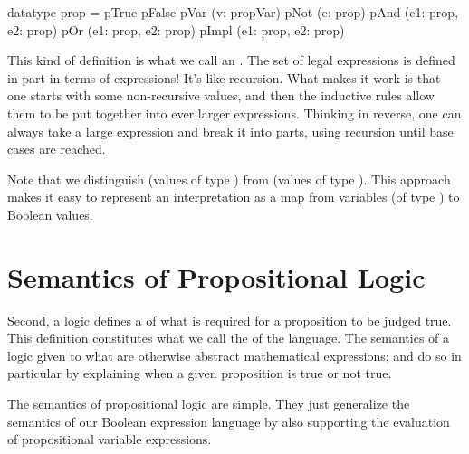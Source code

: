\documentclass[letterpaper,10pt,english]{sphinxmanual}
\begin{document}
\begin{sphinxVerbatim}[commandchars=\\\{\}]
datatype prop =
   pTrue \textbar{}
   pFalse \textbar{}
   pVar (v: propVar) \textbar{}
   pNot (e: prop) \textbar{}
   pAnd (e1: prop, e2: prop) \textbar{}
   pOr (e1: prop, e2: prop) \textbar{}
   pImpl (e1: prop, e2: prop)
\end{sphinxVerbatim}

This kind of definition is what we call an . The
set of legal expressions is defined in part in terms of expressions!
It’s like recursion. What makes it work is that one starts with some
non-recursive  values, and then the inductive rules allow them
to be put together into ever larger expressions. Thinking in reverse,
one can always take a large expression and break it into parts, using
recursion until base cases are reached.

Note that we distinguish  (values of type ) from
 (values of type ). This approach makes it
easy to represent an interpretation as a map from variables (of type
) to Boolean values.


\section{Semantics of Propositional Logic}
\label{\detokenize{09-propositional-logic:semantics-of-propositional-logic}}
Second, a logic defines a of what is required for a proposition to be
judged true. This definition constitutes what we call the 
of the language. The semantics of a logic given  to what are
otherwise abstract mathematical expressions; and do so in particular
by explaining when a given proposition is true or not true.

The semantics of propositional logic are simple. They just generalize
the semantics of our Boolean expression language by also supporting the
evaluation of propositional variable expressions.
\end{document}
